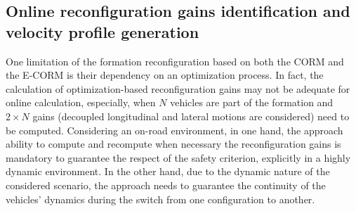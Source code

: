 



  


\subsection{Online reconfiguration gains identification and velocity profile generation} \label{sec:Computation_section}

 One limitation of the formation reconfiguration based on both the CORM and the E-CORM is their dependency on an optimization process. In fact, the calculation of optimization-based reconfiguration gains may not be adequate for online calculation, especially, when $N$ vehicles are part of the formation and $2\times N$ gains (decoupled longitudinal and lateral motions are considered) need to be computed. Considering an on-road environment, in one hand, the approach ability to compute and recompute when necessary the reconfiguration gains is mandatory to guarantee the respect of the safety criterion, explicitly in a highly dynamic environment. In the other hand, due to the dynamic nature of the considered scenario, the approach needs to guarantee the continuity of the vehicles' dynamics during the switch from one configuration to another.  
 
